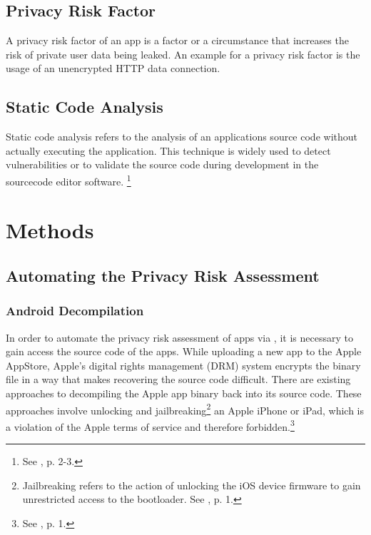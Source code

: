 \documentclass[
	a4paper,
	oneside,
	12pt,
	liststotocnumbered
]{article}
\let\cite\textcite
\begin{document}
\subsection{Privacy Risk Factor}
A privacy risk factor of an app is a factor or a circumstance that increases the risk of private user data being leaked. An example for a privacy risk factor is the usage of an unencrypted HTTP data connection. 

\subsection{Static Code Analysis}

Static code analysis refers to the analysis of an applications source code without actually executing the application. 
This technique is widely used to detect vulnerabilities or to validate the source code during development in the sourcecode editor software. \footnote{See \cite{Bardas2010}, p. 2-3.}

\section{Methods}

\subsection{Automating the Privacy Risk Assessment}

\subsubsection{Android Decompilation}

In order to automate the privacy risk assessment of \mH apps via \sca, it is necessary to gain access the source code of the apps. 
While uploading a new app to the Apple AppStore, Apple's digital rights management (\acs{DRM}) system encrypts the binary file in a way that makes recovering the source code difficult. 
There are existing approaches to decompiling the Apple app binary back into its source code.
These approaches involve unlocking and jailbreaking\footnote{Jailbreaking refers to the action of unlocking the iOS device firmware to gain unrestricted access to the bootloader. See \cite{Kweller2010}, p. 1.}
an Apple iPhone or iPad, which is a violation of the Apple terms of service and therefore forbidden.\footnote{See \cite{Kweller2010}, p. 1.}
\end{document}
